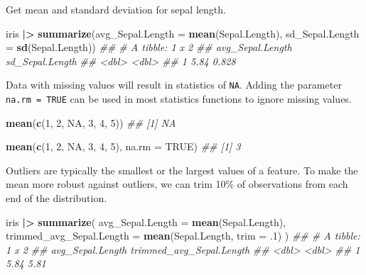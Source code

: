 \documentclass[
  notitlepage]{book}
\newenvironment{Shaded}{\begin{snugshade}}{\end{snugshade}}
\newcommand{\CommentTok}[1]{\textcolor[rgb]{0.56,0.35,0.01}{\textit{#1}}}
\newcommand{\DataTypeTok}[1]{\textcolor[rgb]{0.13,0.29,0.53}{#1}}
\newcommand{\DecValTok}[1]{\textcolor[rgb]{0.00,0.00,0.81}{#1}}
\newcommand{\ErrorTok}[1]{\textcolor[rgb]{0.64,0.00,0.00}{\textbf{#1}}}
\newcommand{\FloatTok}[1]{\textcolor[rgb]{0.00,0.00,0.81}{#1}}
\newcommand{\KeywordTok}[1]{\textcolor[rgb]{0.13,0.29,0.53}{\textbf{#1}}}
\newcommand{\NormalTok}[1]{#1}
\newcommand{\OperatorTok}[1]{\textcolor[rgb]{0.81,0.36,0.00}{\textbf{#1}}}
\newcommand{\OtherTok}[1]{\textcolor[rgb]{0.56,0.35,0.01}{#1}}
\newcommand{\StringTok}[1]{\textcolor[rgb]{0.31,0.60,0.02}{#1}}
\begin{document}
Get mean and standard deviation for sepal length.

\begin{Shaded}
\begin{Highlighting}[]
\NormalTok{iris }\OperatorTok{|}\ErrorTok{\textgreater{}}\StringTok{ }
\StringTok{  }\KeywordTok{summarize}\NormalTok{(}\DataTypeTok{avg\_Sepal.Length =} \KeywordTok{mean}\NormalTok{(Sepal.Length), }
            \DataTypeTok{sd\_Sepal.Length =} \KeywordTok{sd}\NormalTok{(Sepal.Length))}
\CommentTok{\#\# \# A tibble: 1 x 2}
\CommentTok{\#\#   avg\_Sepal.Length sd\_Sepal.Length}
\CommentTok{\#\#              \textless{}dbl\textgreater{}           \textless{}dbl\textgreater{}}
\CommentTok{\#\# 1             5.84           0.828}
\end{Highlighting}
\end{Shaded}

Data with missing values will result in statistics of \texttt{NA}. Adding the
parameter \texttt{na.rm\ =\ TRUE} can be used in most statistics functions to
ignore missing values.

\begin{Shaded}
\begin{Highlighting}[]
\KeywordTok{mean}\NormalTok{(}\KeywordTok{c}\NormalTok{(}\DecValTok{1}\NormalTok{, }\DecValTok{2}\NormalTok{, }\OtherTok{NA}\NormalTok{, }\DecValTok{3}\NormalTok{, }\DecValTok{4}\NormalTok{, }\DecValTok{5}\NormalTok{))}
\CommentTok{\#\# [1] NA}
\end{Highlighting}
\end{Shaded}

\begin{Shaded}
\begin{Highlighting}[]
\KeywordTok{mean}\NormalTok{(}\KeywordTok{c}\NormalTok{(}\DecValTok{1}\NormalTok{, }\DecValTok{2}\NormalTok{, }\OtherTok{NA}\NormalTok{, }\DecValTok{3}\NormalTok{, }\DecValTok{4}\NormalTok{, }\DecValTok{5}\NormalTok{),  }\DataTypeTok{na.rm =} \OtherTok{TRUE}\NormalTok{)}
\CommentTok{\#\# [1] 3}
\end{Highlighting}
\end{Shaded}

Outliers are typically the smallest or the largest values of a feature.
To make the mean more robust against outliers, we can trim 10\% of
observations from each end of the distribution.

\begin{Shaded}
\begin{Highlighting}[]
\NormalTok{iris }\OperatorTok{|}\ErrorTok{\textgreater{}}
\StringTok{  }\KeywordTok{summarize}\NormalTok{(}
    \DataTypeTok{avg\_Sepal.Length =} \KeywordTok{mean}\NormalTok{(Sepal.Length),}
    \DataTypeTok{trimmed\_avg\_Sepal.Length =} \KeywordTok{mean}\NormalTok{(Sepal.Length, }\DataTypeTok{trim =} \FloatTok{.1}\NormalTok{)}
\NormalTok{  )}
\CommentTok{\#\# \# A tibble: 1 x 2}
\CommentTok{\#\#   avg\_Sepal.Length trimmed\_avg\_Sepal.Length}
\CommentTok{\#\#              \textless{}dbl\textgreater{}                    \textless{}dbl\textgreater{}}
\CommentTok{\#\# 1             5.84                     5.81}
\end{Highlighting}
\end{Shaded}
\end{document}
